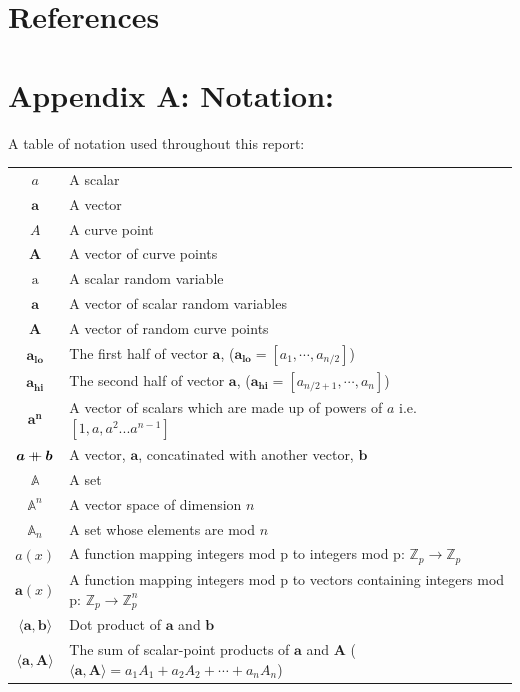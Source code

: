 \documentclass{article}
\renewcommand{\vec}[1]{\boldsymbol{#1}}
\newcommand{\ran}[1]{\mathrm{#1}}
\newcommand{\vecran}[1]{\mathbf{#1}}
\newcommand{\Z}{\mathbb{Z}}
\newcommand\concat{\mathbin{+\mkern-10mu+}} %
\newcommand{\dotp}[2]{\langle #1, #2 \rangle}
\newcommand{\opn}[1]{\operatorname{#1}}
\newcommand{\veclo}[1]{\vec{#1_{\opn{lo}}}}
\newcommand{\vechi}[1]{\vec{#1_{\opn{hi}}}}
\begin{document}

\section{References}
\printbibliography

\section{Appendix A: Notation:} \label{notation}

A table of notation used throughout this report:

\begin{center}
\begin{tabular}{ c l }
	$a$                         & A scalar \\
	$\vec{a}$                   & A vector \\
	$A$                         & A curve point \\
	$\vec{A}$                   & A vector of curve points \\
	$\ran{a}$                   & A scalar random variable \\
	$\vecran{a}$                & A vector of scalar random variables \\
	$\vecran{A}$                & A vector of random curve points \\
	$\veclo{a}$                 & The first half of vector $\vec{a}$, ($\veclo{a} = [a_{1}, \cdots, a_{n/2}]$) \\
	$\vechi{a}$                 & The second half of vector $\vec{a}$, ($\vechi{a} = [a_{n/2+1}, \cdots, a_{n}]$) \\
	$\vec{a^n}$                 & A vector of scalars which are made up of powers of $a$ i.e. $[1,a,a^2... a^{n-1}]$\\
	$\vec{a} \concat \vec{b}$   & A vector, $\vec{a}$, concatinated with another vector, $\vec{b}$\\
	$\mathbb{A}$                & A set \\
	$\mathbb{A}^n$              & A vector space of dimension $n$ \\ 
	$\mathbb{A}_n$              & A set whose elements are mod $n$ \\ 
	$a(x)$                      & A function mapping integers mod p to integers mod p: $\Z_p \rightarrow \Z_p$ \\
	$\vec{a}(x)$                & A function mapping integers mod p to vectors containing integers mod p: $\Z_p \rightarrow \Z^n_p$ \\
	$\dotp{\vec{a}}{\vec{b}}$   & Dot product of $\vec{a}$ and $\vec{b}$ \\
	$\dotp{\vec{a}}{\vec{A}}$   & The sum of scalar-point products of $\vec{a}$ and $\vec{A}$ ($\dotp{\vec{a}}{\vec{A}} = a_1 A_1 + a_2 A_2 + \cdots + a_n A_n$) \\
\end{tabular}
\end{center}
\end{document}
